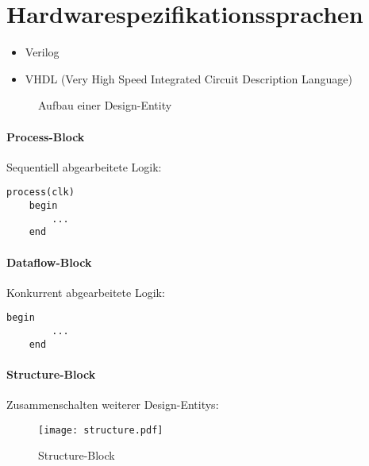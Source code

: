 
\section{Hardwarespezifikationssprachen}
\begin{itemize}
    \item Verilog
    \item VHDL (Very High Speed Integrated Circuit Description Language)
\end{itemize}

\begin{figure}[H]
    \centering
    \caption{Aufbau einer Design-Entity}
\end{figure}

\paragraph{Process-Block}
Sequentiell abgearbeitete Logik:
\begin{lstlisting}[style=vhdl]
    process(clk)
    begin
        ...
    end
\end{lstlisting}

\paragraph{Dataflow-Block}
Konkurrent abgearbeitete Logik:
\begin{lstlisting}[style=vhdl]
    begin
        ...
    end
\end{lstlisting}

\paragraph{Structure-Block}
Zusammenschalten weiterer Design-Entitys:
\begin{figure}[H]
    \centering
    \texttt{[image: structure.pdf]}
    \caption{Structure-Block}
\end{figure}

